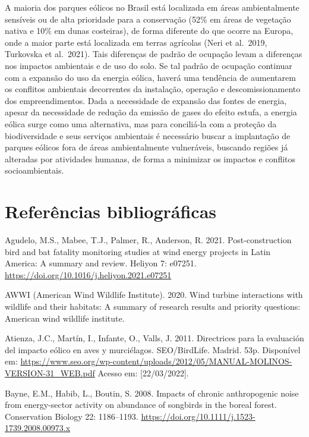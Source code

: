 \documentclass[
  oneside]{scrbook}
\begin{document}
A maioria dos parques eólicos no Brasil está localizada em áreas ambientalmente sensíveis ou de alta prioridade para a conservação (52\% em áreas de vegetação nativa e 10\% em dunas costeiras), de forma diferente do que ocorre na Europa, onde a maior parte está localizada em terras agrícolas (Neri et al.~2019, Turkovska et al.~2021). Tais diferenças de padrão de ocupação levam a diferenças nos impactos ambientais e de uso do solo. Se tal padrão de ocupação continuar com a expansão do uso da energia eólica, haverá uma tendência de aumentarem os conflitos ambientais decorrentes da instalação, operação e descomissionamento dos empreendimentos. Dada a necessidade de expansão das fontes de energia, apesar da necessidade de redução da emissão de gases do efeito estufa, a energia eólica surge como uma alternativa, mas para conciliá-la com a proteção da biodiversidade e seus serviços ambientais é necessário buscar a implantação de parques eólicos fora de áreas ambientalmente vulneráveis, buscando regiões já alteradas por atividades humanas, de forma a minimizar os impactos e conflitos socioambientais.

\newpage

\hypertarget{referuxeancias-bibliogruxe1ficas-3}{%
\section{Referências bibliográficas}\label{referuxeancias-bibliogruxe1ficas-3}}

Agudelo, M.S., Mabee, T.J., Palmer, R., Anderson, R. 2021. Post-construction bird and bat fatality monitoring studies at wind energy projects in Latin America: A summary and review. Heliyon 7: e07251. \url{https://doi.org/10.1016/j.heliyon.2021.e07251}

AWWI (American Wind Wildlife Institute). 2020. Wind turbine interactions with wildlife and their habitats: A summary of research results and priority questions: American wind wildlife institute.

Atienza, J.C., Martín, I., Infante, O., Valls, J. 2011. Directrices para la evaluación del impacto eólico en aves y murciélagos. SEO/BirdLife. Madrid. 53p. Disponível em: \url{https://www.seo.org/wp-content/uploads/2012/05/MANUAL-MOLINOS-VERSION-31_WEB.pdf} Acesso em: {[}22/03/2022{]}.

Bayne, E.M., Habib, L., Boutin, S. 2008. Impacts of chronic anthropogenic noise from energy-sector activity on abundance of songbirds in the boreal forest. Conservation Biology 22: 1186--1193. \url{https://doi.org/10.1111/j.1523-1739.2008.00973.x}
\end{document}
